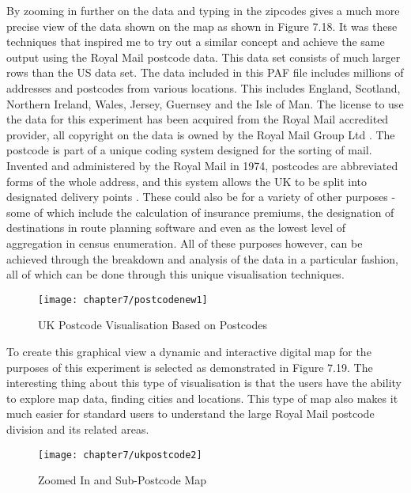 By zooming in further on the data and typing in the zipcodes gives a much more precise view of the data shown on the map as shown in Figure 7.18. It was these techniques that inspired me to try out a similar concept and achieve the same output using the Royal Mail postcode data. This data set consists of much larger rows than the US data set. The data included in this PAF file includes millions of addresses and postcodes from various locations. This includes England, Scotland, Northern Ireland, Wales, Jersey, Guernsey and the Isle of Man. The license to use the data for this experiment has been acquired from the Royal Mail accredited provider, all copyright on the data is owned by the Royal Mail Group Ltd \cite{mail1997postcode}. The postcode is part of a unique coding system designed for the sorting of mail. Invented and administered by the Royal Mail in 1974, postcodes are abbreviated forms of the whole address, and this system allows the UK to be split into designated delivery points \cite{mail1997postcode}. These could also be for a variety of other purposes - some of which include the calculation of insurance premiums, the designation of destinations in route planning software and even as the lowest level of aggregation in census enumeration. All of these purposes however, can be achieved through the breakdown and analysis of the data in a particular fashion, all of which can be done through this unique visualisation techniques.

\begin{figure}[H]
\centering
\texttt{[image: chapter7/postcodenew1]}
\caption{UK Postcode Visualisation Based on Postcodes}
\end{figure}

To create this graphical view a dynamic and interactive digital map for the purposes of this experiment is selected as demonstrated in Figure 7.19. The interesting thing about this type of visualisation is that the users have the ability to explore map data, finding cities and locations. This type of map also makes it much easier for standard users to understand the large Royal Mail postcode division and its related areas.

\begin{figure}[H]
\centering
\texttt{[image: chapter7/ukpostcode2]}
\caption{ Zoomed In and Sub-Postcode Map}
\end{figure}

